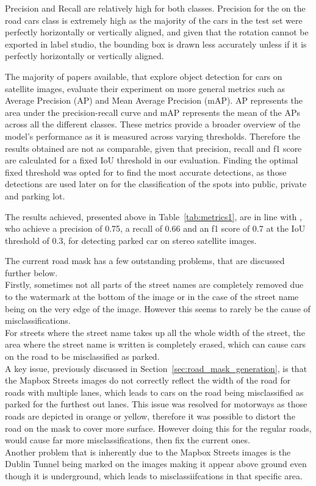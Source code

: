 Precision and Recall are relatively high for both classes. Precision for the on the road cars class is extremely high as the majority of the cars in the test set were perfectly horizontally or vertically aligned, and given that the rotation cannot be exported in label studio, the bounding box is drawn less accurately unless if it is perfectly horizontally or vertically aligned.

\newpage{}

The majority of papers available, that explore object detection for cars on satellite images, evaluate their experiment on more general metrics such as Average Precision (AP) and Mean Average Precision (mAP). AP represents the area under the precision-recall curve and mAP represents the mean of the APs across all the different classes. These metrics provide a broader overview of the model's performance as it is measured across varying thresholds.
Therefore the results obtained are not as comparable, given that precision, recall and f1 score are calculated for a fixed IoU threshold in our evaluation.
Finding the optimal fixed threshold was opted for to find the most accurate detections, as those detections are used later on for the classification of the spots into public, private and parking lot.

The results achieved, presented above in Table~\ref{tab:metrics1}, are in line with \cite{similarresults}, who achieve a precision of 0.75, a recall of 0.66 and an f1 score of 0.7 at the IoU threshold of 0.3, for detecting parked car on stereo satellite images.

The current road mask has a few outstanding problems, that are discussed further below.\\
Firstly, sometimes not all parts of the street names are completely removed due to the watermark at the bottom of the image or in the case of the street name being on the very edge of the image. However this seems to rarely be the cause of misclassifications.\\
For streets where the street name takes up all the whole width of the street, the area where the street name is written is completely erased, which can cause cars on the road to be misclassified as parked.\\
A key issue, previously discussed in Section~\ref{sec:road_mask_generation}, is that the Mapbox Streets images do not correctly reflect the width of the road for roads with multiple lanes, which leads to cars on the road being misclassified as parked for the furthest out lanes.
This issue was resolved for motorways as those roads are depicted in orange or yellow, therefore it was possible to distort the road on the mask to cover more surface. However doing this for the regular roads, would cause far more misclassifications, then fix the current ones.\\
Another problem that is inherently due to the Mapbox Streets images is the Dublin Tunnel being marked on the images making it appear above ground even though it is underground, which leads to misclassiifcations in that specific area.

